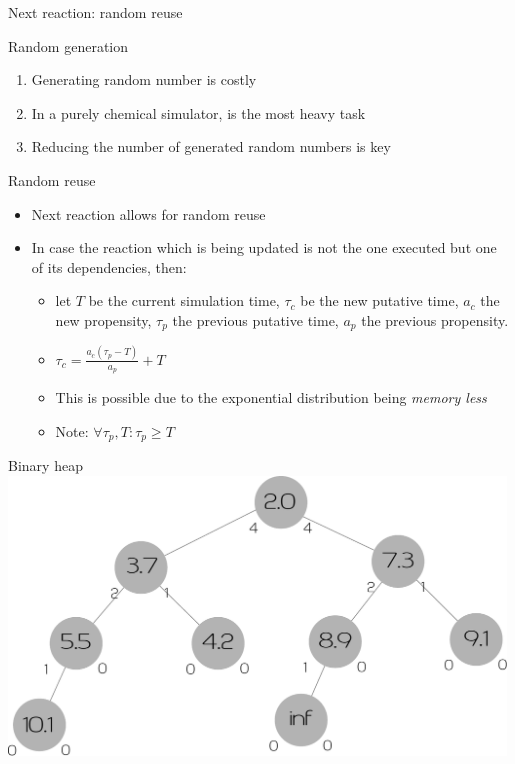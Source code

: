 \documentclass[presentation]{beamer}
\begin{document}
\begin{frame}{Next reaction: random reuse}
 \begin{block}{Random generation}
  \begin{enumerate}
   \item Generating random number is costly
   \item In a purely chemical simulator, is the most heavy task \cite{GibsonJPC1999}
   \item Reducing the number of generated random numbers is key
  \end{enumerate}
 \end{block}
 \begin{block}{Random reuse}
  \begin{itemize}
   \item Next reaction allows for random reuse
   \item In case the reaction which is being updated is not the one executed but one of its dependencies, then:
   \begin{itemize}
    \item let $T$ be the current simulation time, $\tau_c$ be the new putative time, $a_c$ the new propensity, $\tau_p$ the previous putative time, $a_p$ the previous propensity.
    \item $\tau_c = \frac{a_c \left( \tau_p-T \right)}{a_p}+T$ 
    \item This is possible due to the exponential distribution being \emph{memory less}
    \item Note: $\forall \tau_p, T: \tau_p \geq T $
   \end{itemize}
  \end{itemize}
 \end{block}
\end{frame}

\begin{frame}{Binary heap}
  \centering
  \includegraphics[width=0.99\textwidth]{img/extipq}
\end{frame}
\end{document}
